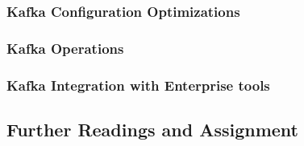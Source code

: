 \subsubsection{Kafka Configuration Optimizations}
\subsubsection{Kafka Operations}
\subsubsection{Kafka Integration with Enterprise tools}%
\subsection{Further Readings and Assignment}
